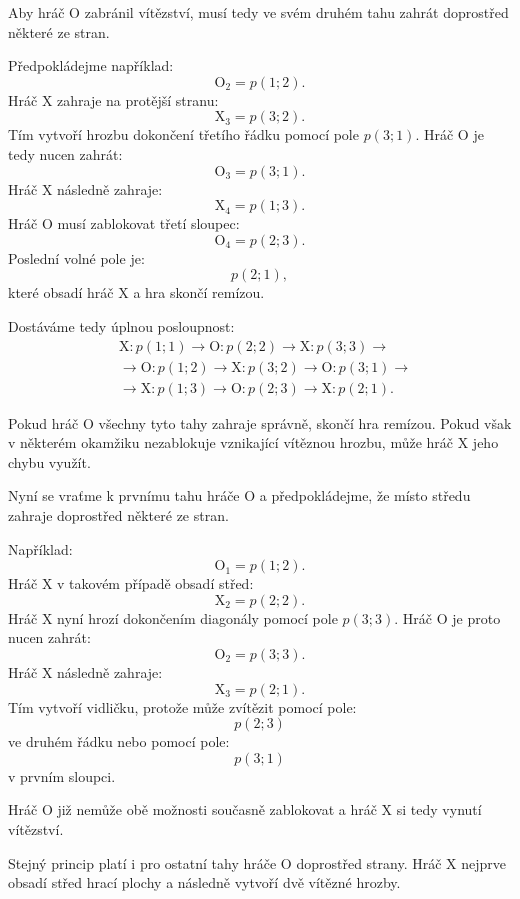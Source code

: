 \documentclass[12pt,a4paper]{article}
\begin{document}
Aby hráč $\mathrm{O}$ zabránil vítězství,
musí tedy ve svém druhém tahu zahrát doprostřed některé ze stran.

Předpokládejme například:
\[
    \mathrm{O}_2=p(1;2).
\]
Hráč $\mathrm{X}$ zahraje na protější stranu:
\[
    \mathrm{X}_3=p(3;2).
\]
Tím vytvoří hrozbu dokončení třetího řádku pomocí pole $p(3;1)$.
Hráč $\mathrm{O}$ je tedy nucen zahrát:
\[
    \mathrm{O}_3=p(3;1).
\]
Hráč $\mathrm{X}$ následně zahraje:
\[
    \mathrm{X}_4=p(1;3).
\]
Hráč $\mathrm{O}$ musí zablokovat třetí sloupec:
\[
    \mathrm{O}_4=p(2;3).
\]
Poslední volné pole je:
\[
    p(2;1),
\]
které obsadí hráč $\mathrm{X}$ a hra skončí remízou.

Dostáváme tedy úplnou posloupnost:
\[
\begin{aligned}
    &\mathrm{X}:p(1;1)
    \rightarrow
    \mathrm{O}:p(2;2)
    \rightarrow
    \mathrm{X}:p(3;3)
    \rightarrow\\
    &\rightarrow
    \mathrm{O}:p(1;2)
    \rightarrow
    \mathrm{X}:p(3;2)
    \rightarrow
    \mathrm{O}:p(3;1)
    \rightarrow\\
    &\rightarrow
    \mathrm{X}:p(1;3)
    \rightarrow
    \mathrm{O}:p(2;3)
    \rightarrow
    \mathrm{X}:p(2;1).
\end{aligned}
\]

Pokud hráč $\mathrm{O}$ všechny tyto tahy zahraje správně, skončí hra remízou.
Pokud však v některém okamžiku nezablokuje vznikající vítěznou hrozbu, 
může hráč $\mathrm{X}$ jeho chybu využít.

Nyní se vraťme k prvnímu tahu hráče $\mathrm{O}$ a předpokládejme, 
že místo středu zahraje doprostřed některé ze stran.

Například:
\[
    \mathrm{O}_1=p(1;2).
\]
Hráč $\mathrm{X}$ v takovém případě obsadí střed:
\[
    \mathrm{X}_2=p(2;2).
\]
Hráč $\mathrm{X}$ nyní hrozí dokončením diagonály pomocí pole $p(3;3)$.
Hráč $\mathrm{O}$ je proto nucen zahrát:
\[
    \mathrm{O}_2=p(3;3).
\]
Hráč $\mathrm{X}$ následně zahraje:
\[
    \mathrm{X}_3=p(2;1).
\]
Tím vytvoří vidličku, protože může zvítězit pomocí pole:
\[
    p(2;3)
\]
ve druhém řádku nebo pomocí pole:
\[
    p(3;1)
\]
v prvním sloupci.

Hráč $\mathrm{O}$ již nemůže obě možnosti současně zablokovat 
a hráč $\mathrm{X}$ si tedy vynutí vítězství.

Stejný princip platí i pro ostatní tahy hráče $\mathrm{O}$ doprostřed strany.
Hráč $\mathrm{X}$ nejprve obsadí střed hrací plochy a následně vytvoří dvě vítězné hrozby.
\end{document}
